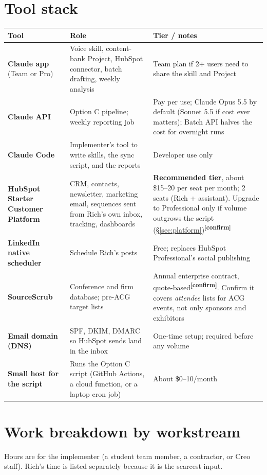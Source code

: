 \documentclass[11pt]{article}
\newcommand{\verify}{\textcolor{orange!80!black}{\textsuperscript{\textbf{[confirm]}}}}
\begin{document}
\section{Tool stack}
\begin{center}
\renewcommand{\arraystretch}{1.25}\small
\begin{tabular}{L{3.4cm} L{5.6cm} L{4.6cm}}
\toprule
\textbf{Tool} & \textbf{Role} & \textbf{Tier / notes} \\
\midrule
\textbf{Claude app} (Team or Pro) & Voice skill, content-bank Project, HubSpot connector,
batch drafting, weekly analysis & Team plan if 2+ users need to share the skill and Project \\
\textbf{Claude API} & Option C pipeline; weekly reporting job &
Pay per use; Claude Opus 5.5 by default (Sonnet 5.5 if cost ever matters); Batch API halves the
cost for overnight runs \\
\textbf{Claude Code} & Implementer's tool to write skills, the sync script, and the reports &
Developer use only \\
\textbf{HubSpot Starter Customer Platform} & CRM, contacts, newsletter, marketing email,
sequences sent from Rich's own inbox, tracking, dashboards & \textbf{Recommended tier}, about
\$15--20 per seat per month; 2 seats (Rich + assistant). Upgrade to Professional only if volume
outgrows the script (\S\ref{sec:platform})\verify \\
\textbf{LinkedIn native scheduler} & Schedule Rich's posts & Free; replaces HubSpot
Professional's social publishing \\
\textbf{SourceScrub} & Conference and firm database; pre-ACG target lists & Annual enterprise
contract, quote-based\verify. Confirm it covers \emph{attendee} lists for ACG events, not only
sponsors and exhibitors \\
\textbf{Email domain (DNS)} & SPF, DKIM, DMARC so HubSpot sends land in the inbox & One-time
setup; required before any volume \\
\textbf{Small host for the script} & Runs the Option C script (GitHub Actions, a cloud
function, or a laptop cron job) & About \$0--10/month \\
\bottomrule
\end{tabular}
\end{center}

\section{Work breakdown by workstream}
Hours are for the implementer (a student team member, a contractor, or Creo staff). Rich's
time is listed separately because it is the scarcest input.
\end{document}

